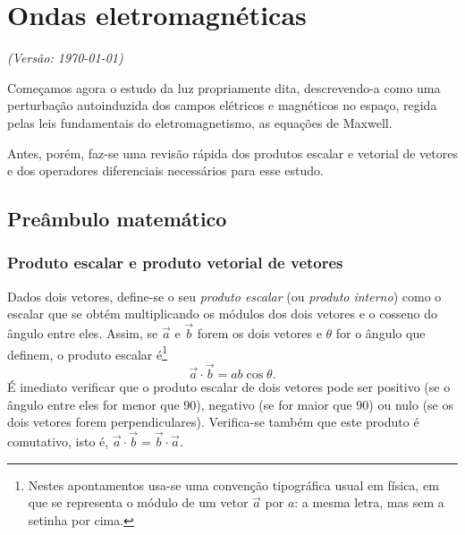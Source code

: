 \chapter{Ondas eletromagnéticas}
\textsl{{\sffamily(Versão: \today)}}

\noindent
Começamos agora o estudo da luz propriamente dita, descrevendo-a como uma
perturbação autoinduzida dos campos elétricos e magnéticos no espaço, regida
pelas leis fundamentais do eletromagnetismo, as equações de Maxwell.

Antes, porém, faz-se uma revisão rápida dos produtos escalar e vetorial de
vetores e dos operadores diferenciais necessários para esse estudo.

\section{Preâmbulo matemático}
\subsection{Produto escalar e produto vetorial de vetores}
Dados dois vetores, define-se o seu \emph{produto escalar} (ou \emph{produto
interno}) como o escalar que se obtém multiplicando os módulos dos dois vetores
e o cosseno do ângulo entre eles. Assim, se $\vec a$ e $\vec b$ forem os dois
vetores e $\theta$ for o ângulo que definem, o produto escalar
é\footnote{Nestes apontamentos usa-se uma convenção tipográfica usual em física,
  em que se representa o módulo de um vetor $\vec a$ por $a$: a mesma letra, mas
sem a setinha por cima.}
\begin{equation}
  \vec a\cdot\vec b= ab\cos\theta.
\end{equation}
É imediato verificar que o produto escalar de dois vetores pode ser positivo (se
o ângulo entre eles for menor que 90\deg), negativo (se for maior que 90\deg) ou
nulo (se os dois vetores forem perpendiculares). Verifica-se também
que este produto é comutativo, isto é, $\vec a\cdot\vec b=\vec b\cdot\vec a$.


